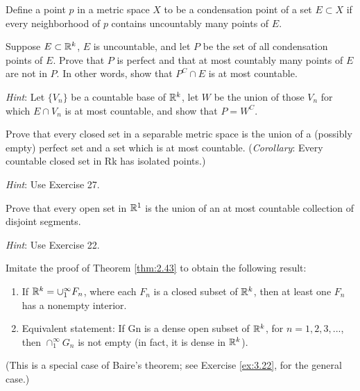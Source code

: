 \begin{myExercise}
    \label{ex:2.27}
    Define a point $p$ in a metric space $X$ to be a condensation point of a set $E \subset X$ if every neighborhood of $p$ contains uncountably many points of $E$. 
    
    Suppose $E \subset {\protect\mathbb R}^k$, $E$ is uncountable, 
    and let $P$ be the set of all condensation points of $E$.
    Prove that $P$ is perfect and that 
    at most countably many points of $E$ are not in $P$. 
    In other words, show that $P^C \cap E$ is at most countable. 
    
    \emph{Hint}: Let $\{V_n\}$ be a countable base of ${\protect\mathbb R}^k$, 
    let $W$ be the union of those $V_n$ for which $E \cap V_n$
    is at most countable, and show that $P = W^C$.
\end{myExercise}

\begin{myExercise}
    \label{ex:2.28}
    Prove that every closed set in a separable metric space is the union of a (possibly empty) perfect set and a set which is at most countable. 
    (\emph{Corollary}: Every countable closed set in Rk has isolated points.) 
    
    \emph{Hint}: Use Exercise 27.
\end{myExercise}


\begin{myExercise}
    \label{ex:2.29}
    Prove that every open set in ${\protect\mathbb R}^1$ is the union of an at most countable collection of disjoint segments. 

    \emph{Hint}: Use Exercise 22.
\end{myExercise}

\begin{myExercise}
    \label{ex:2.30}
    Imitate the proof of Theorem \ref{thm:2.43} to obtain the following result:
    \begin{enumerate}
        \item If ${\protect\mathbb R}^k = \cup_1^{\infty} F_n$, where each $F_n$ is a closed subset of ${\protect\mathbb R}^k$, then at least one $F_n$ has a nonempty interior. 
        \item Equivalent statement: If Gn is a dense open subset of ${\protect\mathbb R}^k$, for $n = 1, 2, 3, ... $, then $\cap_1^{\infty} G_n$ is not empty (in fact, it is dense in ${\protect\mathbb R}^k$).
    \end{enumerate}
    (This is a special case of Baire's theorem; see Exercise \ref{ex:3.22}, for the general case.)
\end{myExercise}
